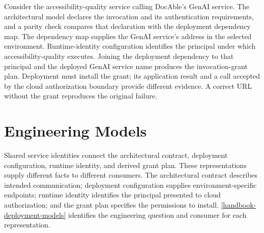 Consider the accessibility-quality service calling DocAble's GenAI service. The architectural model declares the invocation and its authentication requirements, and a parity check compares that declaration with the deployment dependency map. The dependency map supplies the GenAI service's address in the selected environment. Runtime-identity configuration identifies the principal under which accessibility-quality executes. Joining the deployment dependency to that principal and the deployed GenAI service name produces the invocation-grant plan. Deployment must install the grant; its application result and a call accepted by the cloud authorization boundary provide different evidence. A correct URL without the grant reproduces the original failure.

\section{Engineering Models}\label{heading:handbook-model-service-flow}

Shared service identities connect the architectural contract, deployment configuration, runtime identity, and derived grant plan. These representations supply different facts to different consumers. The architectural contract describes intended communication; deployment configuration supplies environment-specific endpoints; runtime identity identifies the principal presented to cloud authorization; and the grant plan specifies the permissions to install. \autoref{handbook-deployment-models} identifies the engineering question and consumer for each representation.

